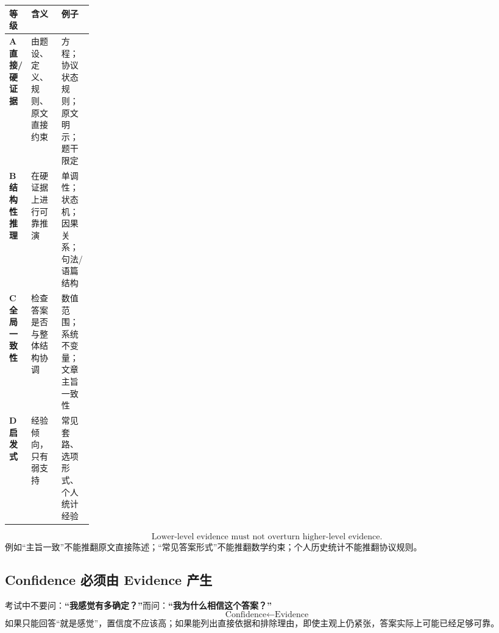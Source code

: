 \documentclass[11pt,a4paper]{ctexart}
\newcommand{\kw}[1]{\textbf{#1}}
\begin{document}
\begin{center}
\end{center}

\begin{center}
\small
\begin{tabularx}{\linewidth}{>{\bfseries}p{0.16\linewidth} X X}
\toprule
等级 & 含义 & 例子 \\
\midrule
A 直接/硬证据 & 由题设、定义、规则、原文直接约束 & 方程；协议状态规则；原文明示；题干限定 \\
B 结构性推理 & 在硬证据上进行可靠推演 & 单调性；状态机；因果关系；句法/语篇结构 \\
C 全局一致性 & 检查答案是否与整体结构协调 & 数值范围；系统不变量；文章主旨一致性 \\
D 启发式 & 经验倾向，只有弱支持 & 常见套路、选项形式、个人统计经验 \\
\bottomrule
\end{tabularx}
\end{center}

\begin{corebox}[证据纪律]
\[
\boxed{\text{Lower-level evidence must not overturn higher-level evidence.}}
\]
例如“主旨一致”不能推翻原文直接陈述；“常见答案形式”不能推翻数学约束；个人历史统计不能推翻协议规则。
\end{corebox}

\subsection{Confidence 必须由 Evidence 产生}
考试中不要问：\kw{“我感觉有多确定？”}\quad 而问：\kw{“我为什么相信这个答案？”}
\[
\boxed{
\text{Confidence}
\leftarrow
\text{Evidence}
}
\]
如果只能回答“就是感觉”，置信度不应该高；如果能列出直接依据和排除理由，即使主观上仍紧张，答案实际上可能已经足够可靠。
\end{document}
